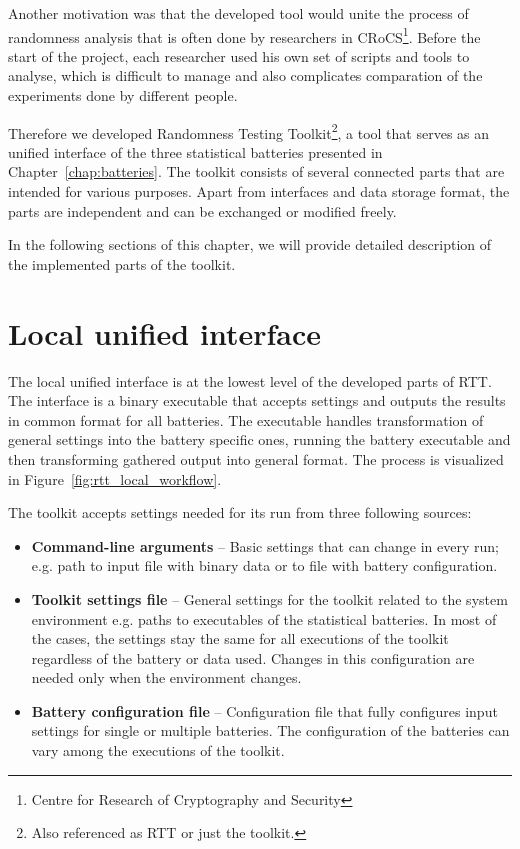 \documentclass[
  digital,  	%
  color,		%
  oneside,   	%
  12pt,
  nocover,
  notable,
  nolof,
  nolot,
]{fithesis3}
\theoremstyle{definition}
\theoremstyle{remark}
\begin{document}
Another motivation was that the developed tool would unite the process of randomness analysis that is often done by researchers in CRoCS\footnote{Centre for Research of Cryptography and Security}. Before the start of the project, each researcher used his own set of scripts and tools to analyse, which is difficult to manage and also complicates comparation of the experiments done by different people.

Therefore we developed Randomness Testing Toolkit\footnote{Also referenced as RTT or just the toolkit.}, a tool that serves as an unified interface of the three statistical batteries presented in Chapter~\ref{chap:batteries}. The toolkit consists of several connected parts that are intended for various purposes. Apart from interfaces and data storage format, the parts are independent and can be exchanged or modified freely.

In the following sections of this chapter, we will provide detailed description of the implemented parts of the toolkit.

\section{Local unified interface}
The local unified interface is at the lowest level of the developed parts of RTT. The interface is a binary executable that accepts settings and outputs the results in common format for all batteries. The executable handles transformation of general settings into the battery specific ones, running the battery executable and then transforming gathered output into general format. The process is visualized in Figure~\ref{fig:rtt_local_workflow}.

The toolkit accepts settings needed for its run from three following sources:
\begin{itemize}
\item \textbf{Command-line arguments} -- Basic settings that can change in every run; e.g. path to input file with binary data or to file with battery configuration.
\item \textbf{Toolkit settings file} -- General settings for the toolkit related to the system environment e.g. paths to executables of the statistical batteries. In most of the cases, the settings stay the same for all executions of the toolkit regardless of the battery or data used. Changes in this configuration are needed only when the environment changes.
\item \textbf{Battery configuration file} -- Configuration file that fully configures input settings for single or multiple batteries. The configuration of the batteries can vary among the executions of the toolkit.
\end{itemize}
\end{document}
